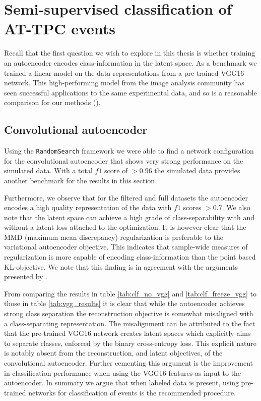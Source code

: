 \section{Semi-supervised classification of AT-TPC events}

Recall that the first question we wish to explore in this thesis is whether training an autoencoder encodes class-information in the latent space. As a benchmark we trained a linear model on the data-representations from a pre-trained VGG16 network. This high-performing model from the image analysis community has seen successful applications to the same experimental data, and so is a reasonable comparison for our methods (\cite{Kuchera2019}). 

\subsection{Convolutional autoencoder}
Using the \lstinline{RandomSearch} framework we were able to find a network configuration for the convolutional autoencoder that shows very strong performance on the simulated data. With a total $f1$ score of $>0.96$ the simulated data provides another benchmark for the results in this section.

 Furthermore, we observe that for the filtered and full datasets the autoencoder encodes a high quality representation of the data with $f1$ scores $>0.7$. We also note that the latent space can achieve a high grade of class-separability with and without a latent loss attached to the optimization. It is however clear that the MMD (maximum mean discrepancy) regularization is preferable to the variational autoencoder objective. This indicates that sample-wide measures of regularization is more capable of encoding class-information than the point based KL-objective. We note that this finding is in agreement with the arguments presented by \citet{Zhao}. 

 From comparing the results in table \ref{tab:clf_no_vgg} and \ref{tab:clf_freeze_vgg} to those in table \ref{tab:vgg_results} it is clear that while the autoencoder achieves strong class separation the reconstruction objective is somewhat misaligned with a class-separating representation. The misalignment can be attributed to the fact that the pre-trained VGG16 network creates latent spaces which explicitly aims to separate classes, enforced by the binary cross-entropy loss. This explicit nature is notably absent from the reconstruction, and latent objectives, of the convolutional autoencoder. Further cementing this argument is the improvement in classification performance when using the VGG16 features as input to the autoencoder. In summary we argue that when labeled data is present, using pre-trained networks for classification of events is the recommended procedure.

